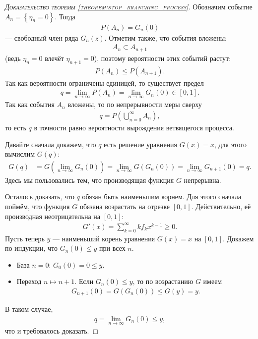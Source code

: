\documentclass[../main.tex]{subfiles}
\begin{document}
 \begin{proof}[\normalfont\textsc{Доказательство теоремы \ref{theorem:stop_branching_process}}]
  Обозначим событие $ A_n = \left\{ \eta_n = 0 \right\} $. Тогда
  \begin{align*}
   P(A_n) = G_n(0)
  \end{align*} --- свободный член ряда $ G_n(z) $. Отметим также, что события вложены:
  \begin{align*}
   A_n \subset A_{n+1}
  \end{align*}
  (ведь $ \eta_n = 0 $ влечёт $ \eta_{n+1} = 0 $), поэтому вероятности этих событий растут:
  \begin{align*}
   P(A_n) \leqslant P(A_{n+1}).
  \end{align*} Так как вероятности ограничены единицей, то существует предел
  \begin{align*}
   q = \lim_{n \to \infty} P(A_n) = \lim_{n \to \infty} G_n(0) \in [0,1].
  \end{align*} Так как события $ A_n $ вложены, то по непрерывности меры сверху
  \begin{align*}
   q = P \left( \bigcup_{n=0}^{\infty} A_n \right),
  \end{align*} то есть $ q $ в точности равно вероятности вырождения ветвящегося процесса.

  Давайте сначала докажем, что $ q $ есть решение уравнения $ G(x) = x $, для этого вычислим $ G(q) $:
  \begin{align*}
   G(q)&=G \left( \lim_{n \to \infty} G_n(0) \right) = \lim_{n \to \infty} G(G_n(0)) = \lim_{n \to \infty} G_{n+1}(0) = q.
  \end{align*} Здесь мы пользовались тем, что производящая функция $ G $ непрерывна.

  Осталось доказать, что $ q $ обязан быть наименьшим корнем. Для этого сначала поймём, что функция $ G $ обязана возрастать на отрезке $ [0,1] $. Действительно, её производная неотрицательна на $ [0,1] $:
  \begin{align*}
   G'(x) = \sum_{k=0}^{\infty} k f_k x^{k-1} \geqslant 0.
  \end{align*} Пусть теперь $ y $ --- наименьший корень уравнения $ G(x) = x $ на $ [0,1] $. Докажем по индукции, что $ G_n(0) \leqslant y $ при всех $ n $. 
  \begin{itemize}
   \item База $ n=0 $: $ G_0(0) = 0 \leqslant y $.
   \item Переход $ n \mapsto n+1 $. Если $ G_n(0) \leqslant y $, то по возрастанию $ G $ имеем
    \begin{align*}
     G_{n+1}(0) = G(G_n(0)) \leqslant G(y) = y.
    \end{align*}
  \end{itemize} В таком случае,
  \begin{align*}
   q = \lim_{n \to \infty} G_n(0) \leqslant y,
  \end{align*} что и требовалось доказать.
 \end{proof}
\end{document}
